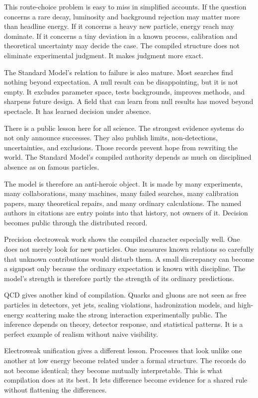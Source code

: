 This route-choice problem is easy to miss in simplified accounts. If the
question concerns a rare decay, luminosity and background rejection may matter
more than headline energy. If it concerns a heavy new particle, energy reach
may dominate. If it concerns a tiny deviation in a known process, calibration
and theoretical uncertainty may decide the case. The compiled structure does
not eliminate experimental judgment. It makes judgment more exact.

The Standard Model's relation to failure is also mature. Most searches find
nothing beyond expectation. A null result can be disappointing, but it is not
empty. It excludes parameter space, tests backgrounds, improves methods, and
sharpens future design. A field that can learn from null results has moved
beyond spectacle. It has learned decision under absence.

There is a public lesson here for all science. The strongest evidence systems
do not only announce successes. They also publish limits, non-detections,
uncertainties, and exclusions. Those records prevent hope from rewriting the
world. The Standard Model's compiled authority depends as much on disciplined
absence as on famous particles.

The model is therefore an anti-heroic object. It is made by many experiments,
many collaborations, many machines, many failed searches, many calibration
papers, many theoretical repairs, and many ordinary calculations. The named
authors in citations are entry points into that history, not owners of it.
Decision becomes public through the distributed record.

Precision electroweak work shows the compiled character especially well. One
does not merely look for new particles. One measures known relations so
carefully that unknown contributions would disturb them. A small discrepancy
can become a signpost only because the ordinary expectation is known with
discipline. The model's strength is therefore partly the strength of its
ordinary predictions.

QCD gives another kind of compilation. Quarks and gluons are not seen as
free particles in detectors, yet jets, scaling violations, hadronization
models, and high-energy scattering make the strong interaction experimentally
public. The inference depends on theory, detector response, and statistical
patterns. It is a perfect example of realism without naive visibility.

Electroweak unification gives a different lesson. Processes that look unlike
one another at low energy become related under a formal structure. The
records do not become identical; they become mutually interpretable. This is
what compilation does at its best. It lets difference become evidence for a
shared rule without flattening the differences.

